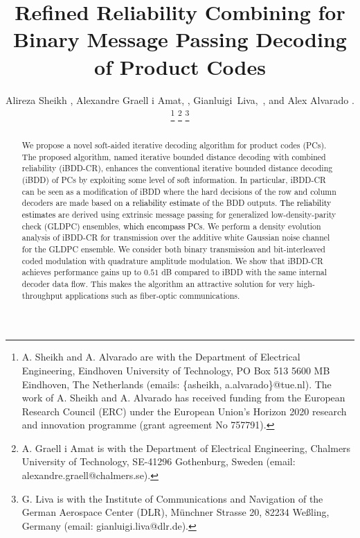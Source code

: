 \documentclass[journal]{IEEEtran}
\newcommand{\SH}{\textcolor{black}}
\newcommand{\GL}{\textcolor{black}}
\newcommand{\AG}{\textcolor{black}}
\begin{document}
	

  


\title{Refined Reliability Combining for Binary Message Passing Decoding of Product Codes}
\author{
	Alireza Sheikh , Alexandre Graell i Amat, , Gianluigi~Liva,~, and Alex Alvarado . 
	\thanks{A. Sheikh and A. Alvarado are with the Department of Electrical Engineering, Eindhoven University of Technology, PO Box 513
		5600 MB Eindhoven, The Netherlands (emails: \{asheikh, a.alvarado\}@tue.nl). The work of A. Sheikh and A. Alvarado has received funding from the European Research Council (ERC) under the European Union's Horizon 2020 research and innovation programme (grant agreement No 757791).}	
	\thanks{A. Graell i Amat is with the Department of Electrical Engineering, Chalmers University of Technology, SE-41296 Gothenburg, Sweden (email: alexandre.graell@chalmers.se).}
	\thanks{G. Liva is with the Institute of Communications and
		Navigation of the German Aerospace Center (DLR), M\"unchner Strasse 20, 82234 We{\ss}ling, Germany (email: gianluigi.liva@dlr.de).}}


\maketitle

\begin{abstract}
	
We propose a novel soft-aided iterative decoding algorithm for product codes (PCs). The proposed algorithm, named iterative bounded distance decoding with combined reliability (iBDD-CR), enhances the conventional iterative bounded distance decoding (iBDD) of PCs by exploiting some level of soft information. In particular, iBDD-CR can be seen as a modification of iBDD where the hard decisions of the row and column decoders  are made based on \GL{a reliability estimate} of the BDD outputs. \GL{The reliability estimates} are derived using extrinsic message passing for generalized low-density-parity check (GLDPC) ensembles, \AG{which  encompass PCs}. 
We perform a density evolution analysis of iBDD-CR  for transmission over the additive white Gaussian noise channel for the GLDPC ensemble. We consider both binary transmission and bit-interleaved coded modulation with quadrature amplitude modulation. We show that iBDD-CR achieves performance gains up to $0.51$ dB compared to iBDD with the same internal decoder data flow.
This makes the algorithm an attractive solution for very high-throughput applications such as fiber-optic communications.  
 
 


\end{abstract}
\end{document}
